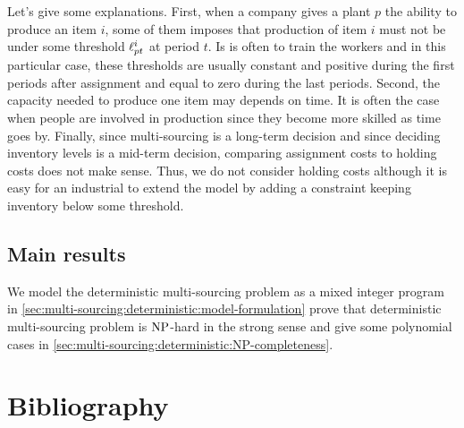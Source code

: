 Let's give some explanations.
First, when a company gives a plant $p$ the ability to produce an item $i$, some of them imposes that production of item $i$ must not be under some threshold $\ell_{pt}^i$ at period $t$.
Is is often to train the workers and in this particular case, these thresholds are usually constant and positive during the first periods after assignment and equal to zero during the last periods.
Second, the capacity needed to produce one item may depends on time.
It is often the case when people are involved in production since they become more skilled as time goes by.
Finally, since multi-sourcing is a long-term decision and since deciding inventory levels is a mid-term decision, comparing assignment costs to holding costs does not make sense.
Thus, we do not consider holding costs although it is easy for an industrial to extend the model by adding a constraint keeping inventory below some threshold.






\subsection{Main results}
\label{sec:multi-sourcing:deterministic:introduction:main_results}


We model the deterministic multi-sourcing problem as a mixed integer program in \cref{sec:multi-sourcing:deterministic:model-formulation} prove that deterministic multi-sourcing problem is $\operatorname{NP}$-hard in the strong sense and give some polynomial cases in \cref{sec:multi-sourcing:deterministic:NP-completeness}.




\section{Bibliography}


